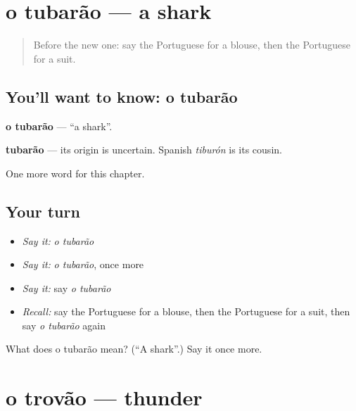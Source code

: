 \section[o tubarão]{o tubarão — a shark}

\label{lesson:PT-C104-tubarao}



\begin{quote}
Before the new one: say the Portuguese for a blouse, then the Portuguese for a suit.
\end{quote}

\subsection*{You'll want to know: o tubarão}
\textbf{o tubarão} — \textquotedblleft{}a shark\textquotedblright{}.

\begin{cousinweb}
\textbf{tubarão} — its origin is uncertain. Spanish \emph{tiburón} is its cousin.
\end{cousinweb}

\begin{grammarlens}[title={What you've built}]
One more word for this chapter.
\end{grammarlens}

\subsection*{Your turn}
\begin{itemize}
\raggedright
  \item \emph{Say it:} \emph{o tubarão}
  \item \emph{Say it:} \emph{o tubarão}, once more
  \item \emph{Say it:} say \emph{o tubarão}
  \item \emph{Recall:} say the Portuguese for a blouse, then the Portuguese for a suit, then say \emph{o tubarão} again
\end{itemize}

\begin{tcolorbox}[breakable,colback=teal!4,colframe=teal!35!black,title={Before you move on}]
What does o tubarão mean? (\textquotedblleft{}A shark\textquotedblright{}.) Say it once more.
\end{tcolorbox}
\section[o trovão]{o trovão — thunder}

